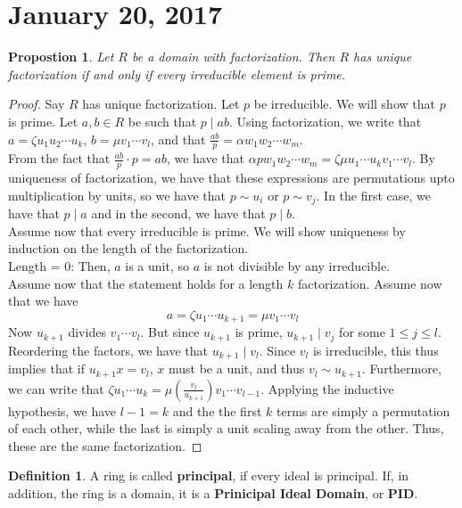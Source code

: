 \documentclass{amsart}
\newtheorem{prop}[thm]{Propostion}
\theoremstyle{definition}
\newtheorem{defn}[thm]{Definition}
\theoremstyle{remark}
\begin{document}
\section{January 20, 2017}
\begin{prop}
    Let $R$ be a domain with factorization. Then $R$ has unique factorization if and
    only if every irreducible element is prime.
\end{prop}
\begin{proof}
    Say $R$ has unique factorization. Let $p$ be irreducible. We will show that
    $p$ is prime. Let $a,b \in R$ be such that $p \mid ab$. Using factorization,
    we write that $a = \zeta u_1u_2 \cdots u_k$, $b = \mu v_1\cdots v_l$, and that
    $\frac{ab}{p} = \alpha w_1w_2 \cdots w_m$. \\
    From the fact that $\frac{ab}{p}\cdot p = ab$, we have that $\alpha p w_1w_2\cdots w_m = \zeta\mu u_1\cdots u_kv_1 \cdots v_l$.
    By uniqueness of factorization, we have that these expressions are permutations
    upto multiplication by units, so we have that $p \sim u_i$ or $p \sim v_j$. In
    the first case, we have that $p \mid a$ and in the second, we have that $p \mid b$. \\
    Assume now that every irreducible is prime. We will show uniqueness by induction
    on the length of the factorization. \\
    Length = 0: Then, $a$ is a unit, so $a$ is not divisible by any irreducible. \\
    Assume now that the statement holds for a length $k$ factorization.
    Assume now that we have
    $$
    a = \zeta u_1 \cdots u_{k+1} = \mu v_1 \cdots v_l
    $$
    Now $u_{k+1}$ divides $v_1 \cdots v_l$. But since $u_{k+1}$ is prime, $u_{k+1} \mid v_j$
    for some $1 \leq j \leq l$. Reordering the factors, we have that
    $u_{k+1} \mid v_l$. Since $v_l$ is irreducible, this thus implies that if $u_{k+1}x = v_l$,
    $x$ must be a unit, and thus $v_l \sim u_{k+1}$. Furthermore, we can write that
    $\zeta u_1 \cdots u_k = \mu \left(\frac{v_l}{u_{k+1}}\right) v_1 \cdots v_{l-1}$. Applying
    the inductive hypothesis, we have $l -1 = k$ and the the first $k$ terms
    are simply a permutation of each other, while the last is simply a unit scaling
    away from the other. Thus, these are the same factorization.
\end{proof}
\begin{defn}
    A ring is called \textbf{principal}, if every ideal is principal. If,
    in addition, the ring is a domain, it is a \textbf{Prinicipal Ideal Domain}, or
    \textbf{PID}.
\end{defn}
\end{document}
